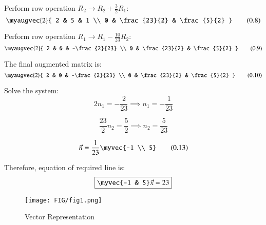 \documentclass[journal]{IEEEtran}
\begin{document}
Perform row operation \(R_2 \to R_2 + \frac{3}{2} R_1\):
\[
\myaugvec{2}{
2 & 5 & 1 \\
0 & \frac{23}{2} & \frac{5}{2}
}
\tag{0.8}
\]

Perform row operation \(R_1 \to R_1 - \frac{10}{23} R_2\):
\[
\myaugvec{2}{
2 & 0 & -\frac{2}{23} \\
0 & \frac{23}{2} & \frac{5}{2}
}
\tag{0.9}
\]

The final augmented matrix is:
\[
\myaugvec{2}{
2 & 0 & -\frac{2}{23} \\
0 & \frac{23}{2} & \frac{5}{2}
}
\tag{0.10}
\]

Solve the system:
\[
2 n_1 = -\frac{2}{23} \implies n_1 = -\frac{1}{23}
\tag{0.11}
\]

\[
\frac{23}{2} n_2 = \frac{5}{2} \implies n_2 = \frac{5}{23}
\tag{0.12}
\]

\[
\vec{n} = \frac{1}{23} \myvec{-1 \\ 5}
\tag{0.13}
\]

Therefore, equation of required line is:
\[
\boxed{
\myvec{-1 & 5} \vec{x} = 23
}
\]

\begin{figure}[htbp]
    \centering
    \texttt{[image: FIG/fig1.png]}
    \caption{Vector Representation}
    \label{fig:FIG/fig1.png}
    \end{figure}
\end{document}
